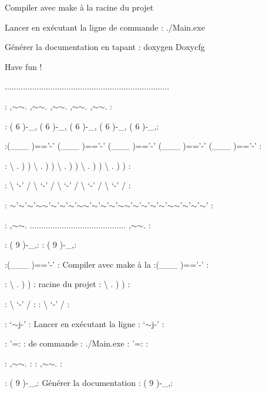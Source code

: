 Compiler avec make à la racine du projet

Lancer en exécutant la ligne de commande \-: ./\-Main.exe

Générer la documentation en tapant \-: doxygen Doxycfg

Have fun !

........................................................................ \par
\-: ,$\sim$$\sim$. ,$\sim$$\sim$. ,$\sim$$\sim$. ,$\sim$$\sim$. ,$\sim$$\sim$. \-: \par
\-: ( 6 )-\/\-\_\-, ( 6 )-\/\-\_\-, ( 6 )-\/\-\_\-, ( 6 )-\/\-\_\-, ( 6 )-\/\-\_\-,\-: \par
\-:(\-\_\-\-\_\-\-\_\- )=='-\/' (\-\_\-\-\_\-\-\_\- )=='-\/' (\-\_\-\-\_\-\-\_\- )=='-\/' (\-\_\-\-\_\-\-\_\- )=='-\/' (\-\_\-\-\_\-\-\_\- )=='-\/' \-: \par
\-: \textbackslash{} . ) ) \textbackslash{} . ) ) \textbackslash{} . ) ) \textbackslash{} . ) ) \textbackslash{} . ) ) \-: \par
\-: \textbackslash{} `-\/' / \textbackslash{} `-\/' / \textbackslash{} `-\/' / \textbackslash{} `-\/' / \textbackslash{} `-\/' / \-: \par
\-: $\sim$'{\ttfamily $\sim$'}$\sim$'{\ttfamily $\sim$}$\sim$'{\ttfamily $\sim$'}$\sim$'{\ttfamily $\sim$'}$\sim${\ttfamily $\sim$'}$\sim$'{\ttfamily $\sim$'}$\sim$'{\ttfamily $\sim$}$\sim$'{\ttfamily $\sim$'}$\sim$'{\ttfamily $\sim$'}$\sim$'{\ttfamily $\sim$}$\sim$'{\ttfamily $\sim$'}$\sim$'{\ttfamily $\sim$'} \-: \par
\-: ,$\sim$$\sim$. .......................................... ,$\sim$$\sim$. \-: \par
\-: ( 9 )-\/\-\_\-,\-: \-: ( 9 )-\/\-\_\-,\-: \par
\-:(\-\_\-\-\_\-\-\_\- )=='-\/' \-: Compiler avec make à la \-:(\-\_\-\-\_\-\-\_\- )=='-\/' \-: \par
\-: \textbackslash{} . ) ) \-: racine du projet \-: \textbackslash{} . ) ) \-: \par
\-: \textbackslash{} `-\/' / \-: \-: \textbackslash{} `-\/' / \-: \par
\-: `$\sim$j-\/' \-: Lancer en exécutant la ligne \-: `$\sim$j-\/' \-: \par
\-: '=\-: \-: de commande \-: ./\-Main.exe \-: '=\-: \-: \par
\-: ,$\sim$$\sim$. \-: \-: ,$\sim$$\sim$. \-: \par
\-: ( 9 )-\/\-\_\-,\-: Générer la documentation \-: ( 9 )-\/\-\_\-,\-: \par
$$
